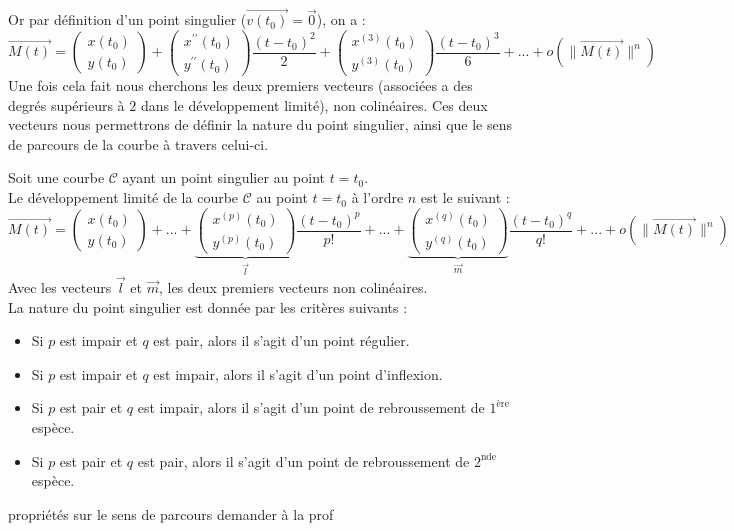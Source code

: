 Or par définition d'un point singulier ($\overrightarrow{v(t_0)}=\overrightarrow{0}$), on a :
$$\overrightarrow{M(t)}=\begin{pmatrix}x(t_0)\\y(t_0)\end{pmatrix}+\begin{pmatrix}x^{\prime\prime}(t_0)\\y^{\prime\prime}(t_0)\end{pmatrix}\frac{(t-t_0)^2}{2}+\begin{pmatrix}x^{(3)}(t_0)\\y^{(3)}(t_0)\end{pmatrix}\frac{(t-t_0)^3}{6}+...+o(\|\overrightarrow{M(t)}\|^n)$$
Une fois cela fait nous cherchons les deux premiers vecteurs (associées a des degrés supérieurs à $2$ dans le développement limité), non colinéaires.
Ces deux vecteurs nous permettrons de définir la nature du point singulier, ainsi que le sens de parcours de la courbe à travers celui-ci.

\begin{prop}
Soit une courbe $\mathscr{C}$ ayant un point singulier au point $t=t_0$.\\
Le développement limité de la courbe $\mathscr{C}$ au point $t=t_0$ à l'ordre $n$ est le suivant :
$$\overrightarrow{M(t)}=\begin{pmatrix}x(t_0)\\y(t_0)\end{pmatrix}+...+\underbrace{\begin{pmatrix}x^{(p)}(t_0)\\y^{(p)}(t_0)\end{pmatrix}}_{\overrightarrow{l}}\frac{(t-t_0)^p}{p!}+...+\underbrace{\begin{pmatrix}x^{(q)}(t_0)\\y^{(q)}(t_0)\end{pmatrix}}_{\overrightarrow{m}}\frac{(t-t_0)^q}{q!}+...+o(\|\overrightarrow{M(t)}\|^n)$$
Avec les vecteurs $\overrightarrow{l}$ et $\overrightarrow{m}$, les deux premiers vecteurs non colinéaires.\\
La nature du point singulier est donnée par les critères suivants :
\begin{itemize}
    \item Si $p$ est impair et $q$ est pair, alors il s'agit d'un point régulier.
    \item Si $p$ est impair et $q$ est impair, alors il s'agit d'un point d'inflexion.
    \item Si $p$ est pair et $q$ est impair, alors il s'agit d'un point de rebroussement de $1^{\text{ère}}$ espèce.
    \item Si $p$ est pair et $q$ est pair, alors il s'agit d'un point de rebroussement de $2^{\text{nde}}$ espèce.
\end{itemize}
\end{prop}
propriétés sur le sens de parcours demander à la prof

